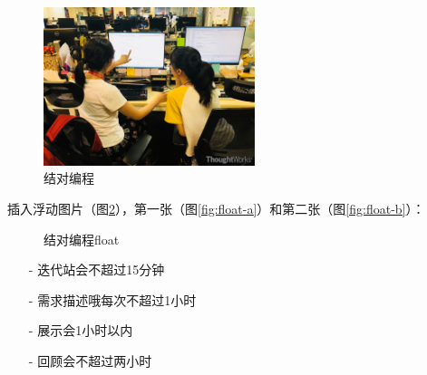\documentclass[UTF8,a4paper,12pt]{ctexart}
\newcommand{\reffig}[1]{（图\ref{#1}）}
\begin{document}
  \begin{figure}[htbp]
  	\centering
  	\includegraphics[width=0.55\textwidth]{picture/pair.jpeg} 
  	\caption{结对编程} %
  	\label{fig:pair} %
  \end{figure}
  
 插入浮动图片\reffig{fig:pair-float}，第一张\reffig{fig:float-a}和第二张\reffig{fig:float-b}：
 
  \begin{figure}[htbp]
  \quad
  \quad
  \caption{结对编程float}
  \label{fig:pair-float}
  \end{figure}
  
  \begin{itemize}
  	\setlength{\itemsep}{0pt}
  	\setlength{\parsep}{0pt}
  	\setlength{\parskip}{0pt}
  	\item[-] 迭代站会不超过15分钟
  	\item[-] 需求描述哦每次不超过1小时
  	\item[-] 展示会1小时以内
  	\item[-] 回顾会不超过两小时
  \end{itemize}
 
\renewcommand\refname{参考文献}
\nocite{*} %
\printbibliography
\end{document}

